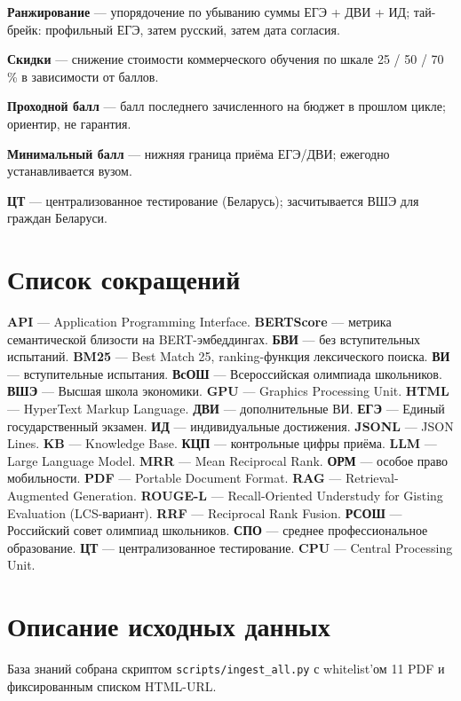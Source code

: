 \documentclass[a4paper,12pt]{extarticle}
\begin{document}
\textbf{Ранжирование} --- упорядочение по убыванию суммы ЕГЭ + ДВИ + ИД; тай-брейк: профильный ЕГЭ, затем русский, затем дата согласия.

\textbf{Скидки} --- снижение стоимости коммерческого обучения по шкале 25 / 50 / 70 \% в зависимости от баллов.

\textbf{Проходной балл} --- балл последнего зачисленного на бюджет в прошлом цикле; ориентир, не гарантия.

\textbf{Минимальный балл} --- нижняя граница приёма ЕГЭ/ДВИ; ежегодно устанавливается вузом.

\textbf{ЦТ} --- централизованное тестирование (Беларусь); засчитывается ВШЭ для граждан Беларуси.

\section{Список сокращений}

\textbf{API} --- Application Programming Interface. \textbf{BERTScore} --- метрика семантической близости на BERT-эмбеддингах. \textbf{БВИ} --- без вступительных испытаний. \textbf{BM25} --- Best Match 25, ranking-функция лексического поиска. \textbf{ВИ} --- вступительные испытания. \textbf{ВсОШ} --- Всероссийская олимпиада школьников. \textbf{ВШЭ} --- Высшая школа экономики. \textbf{GPU} --- Graphics Processing Unit. \textbf{HTML} --- HyperText Markup Language. \textbf{ДВИ} --- дополнительные ВИ. \textbf{ЕГЭ} --- Единый государственный экзамен. \textbf{ИД} --- индивидуальные достижения. \textbf{JSONL} --- JSON Lines. \textbf{KB} --- Knowledge Base. \textbf{КЦП} --- контрольные цифры приёма. \textbf{LLM} --- Large Language Model. \textbf{MRR} --- Mean Reciprocal Rank. \textbf{ОРМ} --- особое право мобильности. \textbf{PDF} --- Portable Document Format. \textbf{RAG} --- Retrieval-Augmented Generation. \textbf{ROUGE-L} --- Recall-Oriented Understudy for Gisting Evaluation (LCS-вариант). \textbf{RRF} --- Reciprocal Rank Fusion. \textbf{РСОШ} --- Российский совет олимпиад школьников. \textbf{СПО} --- среднее профессиональное образование. \textbf{ЦТ} --- централизованное тестирование. \textbf{CPU} --- Central Processing Unit.

\section{Описание исходных данных}

База знаний собрана скриптом \texttt{scripts/ingest\_all.py} с whitelist'ом 11 PDF и фиксированным списком HTML-URL.
\end{document}
